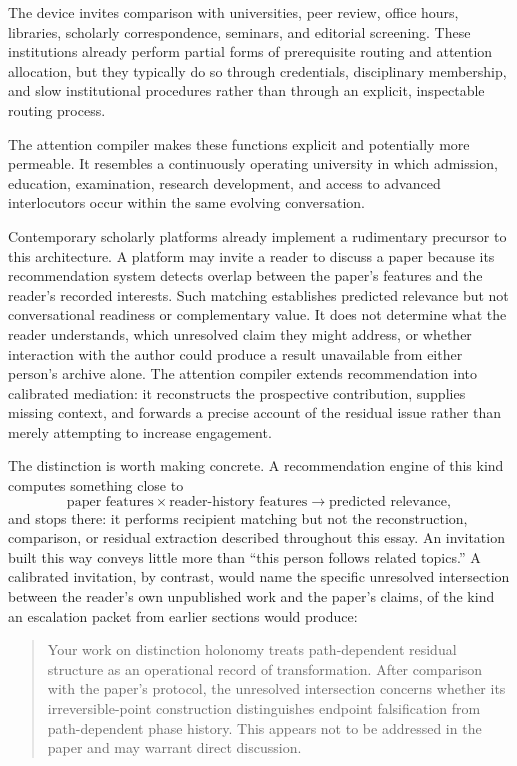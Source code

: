 \documentclass[11pt]{article}
\begin{document}
The device invites comparison with universities, peer review, office hours, libraries, scholarly correspondence, seminars, and editorial screening. These institutions already perform partial forms of prerequisite routing and attention allocation, but they typically do so through credentials, disciplinary membership, and slow institutional procedures rather than through an explicit, inspectable routing process.

The attention compiler makes these functions explicit and potentially more permeable. It resembles a continuously operating university in which admission, education, examination, research development, and access to advanced interlocutors occur within the same evolving conversation.

Contemporary scholarly platforms already implement a rudimentary precursor to this architecture. A platform may invite a reader to discuss a paper because its recommendation system detects overlap between the paper's features and the reader's recorded interests. Such matching establishes predicted relevance but not conversational readiness or complementary value. It does not determine what the reader understands, which unresolved claim they might address, or whether interaction with the author could produce a result unavailable from either person's archive alone. The attention compiler extends recommendation into calibrated mediation: it reconstructs the prospective contribution, supplies missing context, and forwards a precise account of the residual issue rather than merely attempting to increase engagement.

The distinction is worth making concrete. A recommendation engine of this kind computes something close to
\[
\text{paper features} \times \text{reader-history features} \rightarrow \text{predicted relevance},
\]
and stops there: it performs recipient matching but not the reconstruction, comparison, or residual extraction described throughout this essay. An invitation built this way conveys little more than ``this person follows related topics.'' A calibrated invitation, by contrast, would name the specific unresolved intersection between the reader's own unpublished work and the paper's claims, of the kind an escalation packet from earlier sections would produce:

\begin{quote}
Your work on distinction holonomy treats path-dependent residual structure as an operational record of transformation. After comparison with the paper's protocol, the unresolved intersection concerns whether its irreversible-point construction distinguishes endpoint falsification from path-dependent phase history. This appears not to be addressed in the paper and may warrant direct discussion.
\end{quote}
\end{document}
